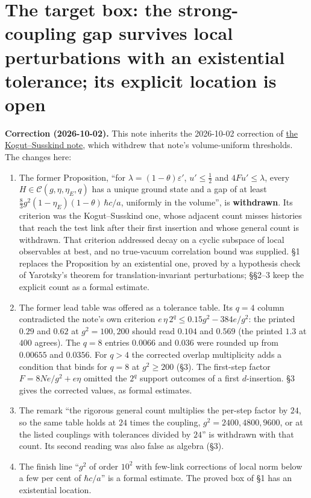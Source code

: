 \documentclass[11pt,a4paper]{article}
\newcommand{\tightlist}{\setlength{\itemsep}{0pt}\setlength{\parskip}{0pt}}
\begin{document}
\hypertarget{the-target-box-the-strong-coupling-gap-survives-local-perturbations-with-an-existential-tolerance-its-explicit-location-is-open}{%
\section{The target box: the strong-coupling gap survives local
perturbations with an existential tolerance; its explicit location is
open}\label{the-target-box-the-strong-coupling-gap-survives-local-perturbations-with-an-existential-tolerance-its-explicit-location-is-open}}

\textbf{Correction (2026-10-02).} This note inherits the 2026-10-02
correction of \href{kogut-susskind-strong-coupling-explicit.md}{the
Kogut--Susskind note}, which withdrew that note's volume-uniform
thresholds. The changes here:

\begin{enumerate}
\def\labelenumi{\arabic{enumi}.}
\tightlist
\item
  The former Proposition, ``for \(\lambda=(1-\theta)\varepsilon'\),
  \(u'\le\frac12\) and \(4Fu'\le\lambda\), every
  \(H\in\mathcal C(g,\eta,\eta_E,q)\) has a unique ground state and a
  gap of at least \(\frac83g^2(1-\eta_E)(1-\theta)\,\hbar c/a\),
  uniformly in the volume'', is \textbf{withdrawn}. Its criterion was
  the Kogut--Susskind one, whose adjacent count misses histories that
  reach the test link after their first insertion and whose general
  count is withdrawn. That criterion addressed decay on a cyclic
  subspace of local observables at best, and no true-vacuum correlation
  bound was supplied. §1 replaces the Proposition by an existential one,
  proved by a hypothesis check of Yarotsky's theorem for
  translation-invariant perturbations; §§2--3 keep the explicit count as
  a formal estimate.
\item
  The former lead table was offered as a tolerance table. Its \(q=4\)
  column contradicted the note's own criterion
  \(e\,\eta\,2^q\le0.15g^2-384e/g^2\): the printed \(0.29\) and \(0.62\)
  at \(g^2=100,200\) should read \(0.104\) and \(0.569\) (the printed
  \(1.3\) at \(400\) agrees). The \(q=8\) entries \(0.0066\) and
  \(0.036\) were rounded up from \(0.00655\) and \(0.0356\). For \(q>4\)
  the corrected overlap multiplicity adds a condition that binds for
  \(q=8\) at \(g^2\ge200\) (§3). The first-step factor
  \(F=8Ne/g^2+e\eta\) omitted the \(2^q\) support outcomes of a first
  \(d\)-insertion. §3 gives the corrected values, as formal estimates.
\item
  The remark ``the rigorous general count multiplies the per-step factor
  by \(24\), so the same table holds at \(24\) times the coupling,
  \(g^2=2400,4800,9600\), or at the listed couplings with tolerances
  divided by \(24\)'' is withdrawn with that count. Its second reading
  was also false as algebra (§3).
\item
  The finish line ``\(g^2\) of order \(10^2\) with few-link corrections
  of local norm below a few per cent of \(\hbar c/a\)'' is a formal
  estimate. The proved box of §1 has an existential location.
\end{enumerate}
\end{document}

